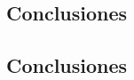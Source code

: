 \begin{otherlanguage}{spanish}

\chapter{Conclusiones}

\section{Conclusiones}

\end{otherlanguage}
